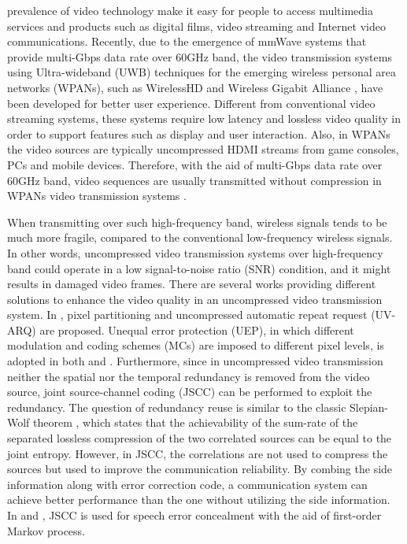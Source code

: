 \documentclass[10pt,twocolumn,twoside]{IEEEtran}
\begin{document}
  prevalence of video technology make it easy for people to access multimedia services and products such as digital films, video streaming and Internet video communications. Recently, due to the emergence of mmWave systems that provide multi-Gbps data rate over 60GHz band, the video transmission systems using Ultra-wideband (UWB) techniques for the emerging wireless personal area networks (WPANs), such as WirelessHD \cite{WirelessHD} and Wireless Gigabit Alliance \cite{Wigig}, have been developed for better user experience. Different from conventional video streaming systems, these systems require low latency and lossless video quality in order to support features such as display and user interaction. Also, in WPANs the video sources are typically uncompressed HDMI streams from game consoles, PCs and mobile devices. Therefore, with the aid of multi-Gbps data rate over 60GHz band, video sequences are usually transmitted without compression in WPANs video transmission systems \cite{60ghz}.

When transmitting over such high-frequency band, wireless signals tends to be much more fragile, compared to the conventional low-frequency wireless signals. In other words, uncompressed video transmission systems over high-frequency band could operate in a low signal-to-noise ratio (SNR) condition, and it might results in damaged video frames. There are several works providing different solutions to enhance the video quality in an uncompressed video transmission system. In \cite{60ghz}, pixel partitioning and uncompressed automatic repeat request (UV-ARQ) are proposed. Unequal error protection (UEP), in which different modulation and coding schemes (MCs) are imposed to different pixel levels, is adopted in both \cite{60ghz} and \cite{ucp_v}. Furthermore, since in uncompressed video transmission neither the spatial nor the temporal redundancy is removed from the video source, joint source-channel coding (JSCC) \cite{JSCC} can be performed to exploit the redundancy. The question of redundancy reuse is similar to the classic Slepian-Wolf theorem \cite{sw}, which states that the achievability of the sum-rate of the separated lossless compression of the two correlated sources can be equal to the joint entropy. However, in JSCC, the correlations are not used to compress the sources but used to improve the communication reliability. By combing the side information along with error correction code, a communication system can achieve better performance than the one without utilizing the side information. In \cite{JSCC_SCCD} and \cite{softbit}, JSCC is used for speech error concealment with the aid of first-order Markov process. 
\end{document}
